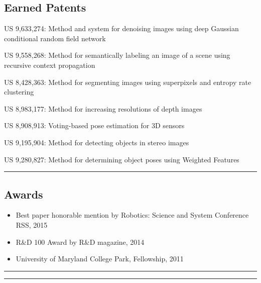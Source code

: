 \documentclass[10pt,letterpaper]{article}
\begin{document}
\subsection*{Earned Patents}
\begin{itemize*}
\item US 9,633,274: Method and system for denoising images using deep Gaussian conditional random field network
\item US 9,558,268: Method for semantically labeling an image of a scene using recursive context propagation
\item US 8,428,363: Method for segmenting images using superpixels and entropy rate clustering
\item US 8,983,177: Method for increasing resolutions of depth images
\item US 8,908,913: Voting-based pose estimation for 3D sensors
\item US 9,195,904: Method for detecting objects in stereo images
\item US 9,280,827: Method for determining object poses using Weighted Features
\end{itemize*}

\hrule
\vspace{-0.4em}
\subsection*{Awards}
\begin{itemize}
\item Best paper honorable mention by Robotics: Science and System Conference RSS, 2015\vspace{-2mm}
\item R\&D 100 Award by R\&D magazine, 2014\vspace{-2mm}
\item University of Maryland College Park, Fellowship, 2011
\end{itemize}
\hrule
\clearpage

\hrule
\vspace{-0.4em}
\end{document}
